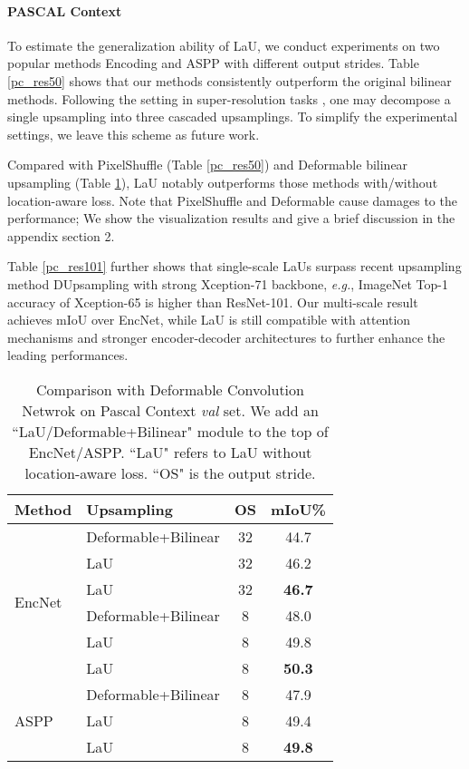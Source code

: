 \documentclass[10pt,twocolumn,letterpaper]{article}
\begin{document}
\paragraph{PASCAL Context} To estimate the generalization ability of LaU, we conduct experiments on two popular methods Encoding \cite{EncNet} and ASPP \cite{ASPP} with different output strides. Table \ref{pc_res50} shows that our methods consistently outperform the original bilinear methods. Following the setting in super-resolution tasks \cite{LinSHR16,HeMWLY019,ShiCHTABRW16}, one may decompose a single  upsampling into three cascaded  upsamplings. To simplify the experimental settings, we leave this scheme as future work.

Compared with PixelShuffle \cite{ShiCHTABRW16} (Table \ref{pc_res50}) and Deformable \cite{DaiQXLZHW17} bilinear upsampling (Table \ref{deformable}), LaU notably outperforms those methods with/without location-aware loss. Note that PixelShuffle and Deformable cause damages to the performance; We show the visualization results and give a brief discussion in the appendix section 2. 

Table \ref{pc_res101} further shows that single-scale LaUs surpass recent upsampling method DUpsampling \cite{DUpsampling} with strong Xception-71 backbone, \textit{e.g.}, ImageNet Top-1 accuracy of Xception-65 is  higher than ResNet-101. Our multi-scale result achieves  mIoU over EncNet, while LaU is still compatible with attention mechanisms and stronger encoder-decoder architectures to further enhance the leading performances.
\begin{table}
  \caption{Comparison with Deformable Convolution Netwrok \cite{DaiQXLZHW17} on Pascal Context \textit{val} set. We add an ``LaU/Deformable+Bilinear" module to the top of EncNet/ASPP. ``LaU" refers to LaU without location-aware loss. ``OS" is the output stride.}
  \centering
\begin{tabular}{l|lcc}
\hline    
Method    & Upsampling & OS   & mIoU\%\\
\hline  \hline  
    \multirow{6}{*}{EncNet \cite{EncNet}}  & Deformable+Bilinear & 32  & 44.7 \\
    & LaU & 32 & 46.2 \\
    & LaU & 32 & \textbf{46.7} \\
\cline{2-4}  
& Deformable+Bilinear & 8  & 48.0  \\
& LaU & 8 & 49.8 \\
    & LaU & 8 & \textbf{50.3} \\
\hline
\multirow{3}{*}{ASPP \cite{ASPP}}  & Deformable+Bilinear & 8  & 47.9 \\
& LaU & 8 & 49.4 \\
    & LaU & 8 & \textbf{49.8} \\
\hline  
  \end{tabular}
\label{deformable}
\end{table}
\end{document}
